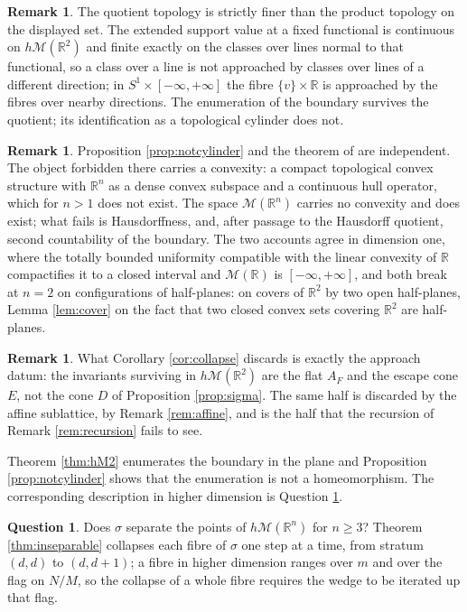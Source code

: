 \documentclass[11pt]{amsart}
\theoremstyle{plain}
\theoremstyle{definition}
\newtheorem{remark}[theorem]{Remark}
\newtheorem{question}[theorem]{Question}
\newcommand{\RR}{\mathbb{R}}
\begin{document}
\begin{remark}\label{rem:finer}
The quotient topology is strictly finer than the product topology on the displayed set. The extended support value at a fixed functional is continuous on $h\mathcal{M}(\RR^2)$ and finite exactly on the classes over lines normal to that functional, so a class over a line is not approached by classes over lines of a different direction; in $S^1\times[-\infty,+\infty]$ the fibre $\{v\}\times\RR$ is approached by the fibres over nearby directions. The enumeration of the boundary survives the quotient; its identification as a topological cylinder does not.
\end{remark}

\begin{remark}\label{rem:vdv}
Proposition \ref{prop:notcylinder} and the theorem of \cite{vdV83} are independent. The object forbidden there carries a convexity: a compact topological convex structure with $\RR^n$ as a dense convex subspace and a continuous hull operator, which for $n>1$ does not exist. The space $\mathcal{M}(\RR^n)$ carries no convexity and does exist; what fails is Hausdorffness, and, after passage to the Hausdorff quotient, second countability of the boundary. The two accounts agree in dimension one, where the totally bounded uniformity compatible with the linear convexity of $\RR$ compactifies it to a closed interval and $\mathcal{M}(\RR)$ is $[-\infty,+\infty]$, and both break at $n=2$ on configurations of half-planes: \cite{vdV83} on covers of $\RR^2$ by two open half-planes, Lemma \ref{lem:cover} on the fact that two closed convex sets covering $\RR^2$ are half-planes.
\end{remark}

\begin{remark}\label{rem:Dcollapse}
What Corollary \ref{cor:collapse} discards is exactly the approach datum: the invariants surviving in $h\mathcal{M}(\RR^2)$ are the flat $A_F$ and the escape cone $E$, not the cone $D$ of Proposition \ref{prop:sigma}. The same half is discarded by the affine sublattice, by Remark \ref{rem:affine}, and is the half that the recursion of Remark \ref{rem:recursion} fails to see.
\end{remark}

Theorem \ref{thm:hM2} enumerates the boundary in the plane and Proposition \ref{prop:notcylinder} shows that the enumeration is not a homeomorphism. The corresponding description in higher dimension is Question \ref{qn:fibre}.

\begin{question}\label{qn:fibre}
Does $\sigma$ separate the points of $h\mathcal{M}(\RR^n)$ for $n\ge3$? Theorem \ref{thm:inseparable} collapses each fibre of $\sigma$ one step at a time, from stratum $(d,d)$ to $(d,d+1)$; a fibre in higher dimension ranges over $m$ and over the flag on $N/M$, so the collapse of a whole fibre requires the wedge to be iterated up that flag.
\end{question}
\end{document}
